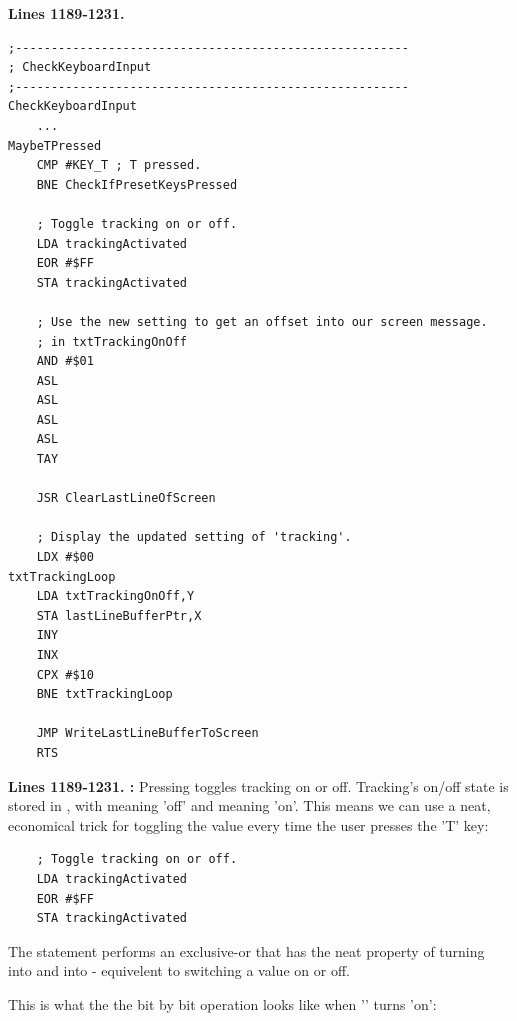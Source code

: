 \clearpage
\textbf{Lines 1189-1231. } 
\begin{lstlisting}
;-------------------------------------------------------
; CheckKeyboardInput
;-------------------------------------------------------
CheckKeyboardInput   
    ...
MaybeTPressed   
    CMP #KEY_T ; T pressed.
    BNE CheckIfPresetKeysPressed

    ; Toggle tracking on or off.
    LDA trackingActivated
    EOR #$FF
    STA trackingActivated

    ; Use the new setting to get an offset into our screen message.
    ; in txtTrackingOnOff
    AND #$01
    ASL 
    ASL 
    ASL 
    ASL 
    TAY 

    JSR ClearLastLineOfScreen

    ; Display the updated setting of 'tracking'.
    LDX #$00
txtTrackingLoop   
    LDA txtTrackingOnOff,Y
    STA lastLineBufferPtr,X
    INY 
    INX 
    CPX #$10
    BNE txtTrackingLoop

    JMP WriteLastLineBufferToScreen
    RTS 
\end{lstlisting}
\clearpage

\textbf{Lines 1189-1231. :} 
Pressing  toggles tracking on or off. Tracking's on/off state is 
stored in , with  meaning 'off' and
 meaning 'on'. This means we can use a neat, economical trick
for toggling the value every time the user presses the 'T' key:

\begin{lstlisting}
    ; Toggle tracking on or off.
    LDA trackingActivated
    EOR #$FF
    STA trackingActivated
\end{lstlisting}

The  statement performs an exclusive-or that has the neat property of
turning  into  and  into  - equivelent
to switching a value on or off.

This is what the the bit by bit operation looks like when '' turns
 'on':

